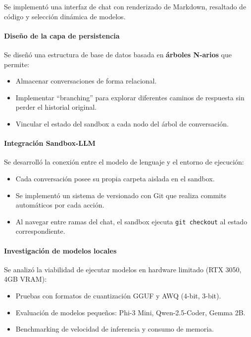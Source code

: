 \documentclass[12pt,a4paper]{article}
\begin{document}
Se implementó una interfaz de chat con renderizado de Markdown, resaltado de código y selección dinámica de modelos.

\paragraph{Diseño de la capa de persistencia}

Se diseñó una estructura de base de datos basada en \textbf{árboles N-arios} que permite:

\begin{itemize}
    \item Almacenar conversaciones de forma relacional.
    \item Implementar ``branching'' para explorar diferentes caminos de respuesta sin perder el historial original.
    \item Vincular el estado del sandbox a cada nodo del árbol de conversación.
\end{itemize}

\paragraph{Integración Sandbox-LLM}

Se desarrolló la conexión entre el modelo de lenguaje y el entorno de ejecución:

\begin{itemize}
    \item Cada conversación posee su propia carpeta aislada en el sandbox.
    \item Se implementó un sistema de versionado con Git que realiza commits automáticos por cada acción.
    \item Al navegar entre ramas del chat, el sandbox ejecuta \texttt{git checkout} al estado correspondiente.
\end{itemize}

\paragraph{Investigación de modelos locales}

Se analizó la viabilidad de ejecutar modelos en hardware limitado (RTX 3050, 4GB VRAM):

\begin{itemize}
    \item Pruebas con formatos de cuantización GGUF y AWQ (4-bit, 3-bit).
    \item Evaluación de modelos pequeños: Phi-3 Mini, Qwen-2.5-Coder, Gemma 2B.
    \item Benchmarking de velocidad de inferencia y consumo de memoria.
\end{itemize}
\end{document}
